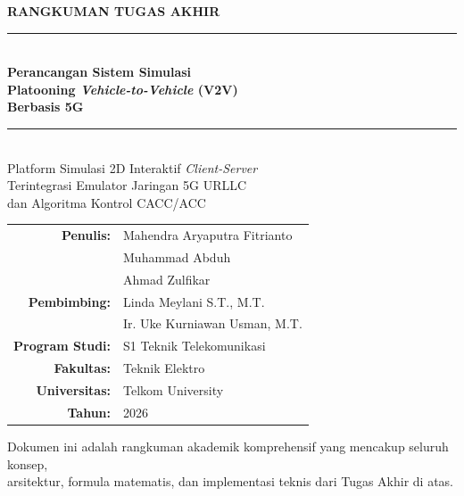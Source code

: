 \documentclass[12pt,a4paper]{article}
\begin{document}

\begin{titlepage}
  \centering
  \vspace*{1cm}
  {\Large\bfseries\color{sectioncolor} RANGKUMAN TUGAS AKHIR\\[0.5em]}
  \rule{\linewidth}{2pt}\\[0.8em]
  {\Huge\bfseries\color{primaryblue}
    Perancangan Sistem Simulasi\\
    Platooning \textit{Vehicle-to-Vehicle} (V2V)\\
    Berbasis 5G\\[0.5em]}
  \rule{\linewidth}{2pt}\\[1.5em]

  {\large
    Platform Simulasi 2D Interaktif \textit{Client-Server}\\
    Terintegrasi Emulator Jaringan 5G URLLC\\
    dan Algoritma Kontrol CACC/ACC
  }\\[2.5em]

  \begin{tabular}{rl}
    \textbf{Penulis:}     & Mahendra Aryaputra Fitrianto \\
                          & Muhammad Abduh \\
                          & Ahmad Zulfikar \\[0.8em]
    \textbf{Pembimbing:}  & Linda Meylani S.T., M.T. \\
                          & Ir. Uke Kurniawan Usman, M.T. \\[0.8em]
    \textbf{Program Studi:} & S1 Teknik Telekomunikasi \\
    \textbf{Fakultas:}    & Teknik Elektro \\
    \textbf{Universitas:} & Telkom University \\[0.8em]
    \textbf{Tahun:}       & 2026 \\
  \end{tabular}

  \vfill
  {\small\color{gray}
    Dokumen ini adalah rangkuman akademik komprehensif yang mencakup seluruh konsep,\\
    arsitektur, formula matematis, dan implementasi teknis dari Tugas Akhir di atas.
  }
\end{titlepage}

\tableofcontents
\newpage

\end{document}
